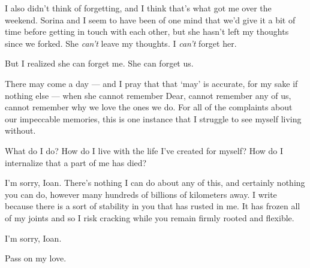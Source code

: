 I also didn't think of forgetting, and I think that's what got me over the weekend. Sorina and I seem to have been of one mind that we'd give it a bit of time before getting in touch with each other, but she hasn't left my thoughts since we forked. She \emph{can't} leave my thoughts. I \emph{can't} forget her.

But I realized she can forget me. She can forget us.

There may come a day — and I pray that that `may' is accurate, for my sake if nothing else — when she cannot remember Dear, cannot remember any of us, cannot remember why we love the ones we do. For all of the complaints about our impeccable memories, this is one instance that I struggle to see myself living without.

What do I do? How do I live with the life I've created for myself? How do I internalize that a part of me has died?

I'm sorry, Ioan. There's nothing I can do about any of this, and certainly nothing you can do, however many hundreds of billions of kilometers away. I write because there is a sort of stability in you that has rusted in me. It has frozen all of my joints and so I risk cracking while you remain firmly rooted and flexible.

I'm sorry, Ioan.

Pass on my love.
